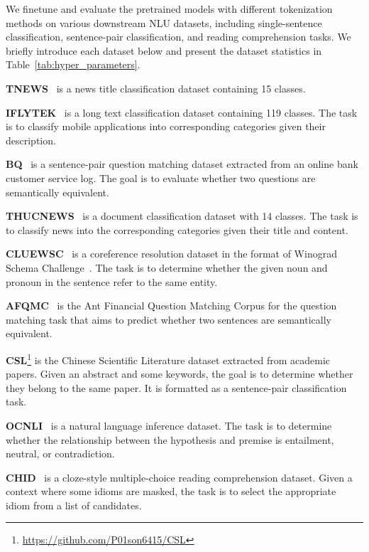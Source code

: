 We finetune and evaluate the pretrained models with different tokenization methods on various downstream NLU datasets, including single-sentence classification, sentence-pair classification, and reading comprehension tasks. We briefly introduce each dataset below and present the dataset statistics in Table~\ref{tab:hyper_parameters}.

\noindent \textbf{TNEWS}~\cite{CLUEBenchmark} is a news title classification dataset containing 15 classes. %

\noindent \textbf{IFLYTEK}~\cite{CLUEBenchmark} is a long text classification dataset containing 119 classes. The task is to classify mobile applications into corresponding categories given their description.

\noindent \textbf{BQ}~\cite{BQ} is a sentence-pair question matching dataset extracted from an online bank customer service log. The goal is to evaluate whether two questions are semantically equivalent.

\noindent \textbf{THUCNEWS}~\cite{THUCNEWS} is a document classification dataset with 14 classes. The task is to classify news into the corresponding categories given their title and content.

\noindent \textbf{CLUEWSC}~\cite{CLUEBenchmark} is a coreference resolution dataset in the format of Winograd Schema Challenge~\cite{levesque2012winograd}. The task is to determine whether the given noun and pronoun in the sentence refer to the same entity.

\noindent \textbf{AFQMC}~\cite{CLUEBenchmark} is the Ant Financial Question Matching Corpus for the question matching task that aims to predict whether two sentences are semantically equivalent.

\noindent \textbf{CSL}\footnote{\url{https://github.com/P01son6415/CSL}} is the Chinese Scientific Literature dataset extracted from academic papers. Given an abstract and some keywords, the goal is to determine whether they belong to the same paper. It is formatted as a sentence-pair classification task.

\noindent \textbf{OCNLI}~\cite{OCNLI} is a natural language inference dataset. The task is to determine whether the relationship between the hypothesis and premise is entailment, neutral, or contradiction.

\noindent \textbf{CHID}~\cite{CHID} is a  cloze-style multiple-choice reading comprehension dataset. Given a context where some idioms are masked, the task is to select the appropriate idiom from a list of candidates.

